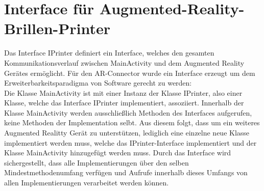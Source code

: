 \section{Interface für Augmented-Reality-Brillen-Printer}
Das Interface IPrinter definiert ein Interface, welches den gesamten Kommunikationsverlauf zwischen MainActivity und dem Augmented Reality Gerätes ermöglicht. Für den AR-Connector wurde ein Interface erzeugt um dem Erweiterbarkeitsparadigma von Software gerecht zu werden:\\
Die Klasse MainActivity ist mit einer Instanz der Klasse IPrinter, also einer Klasse, welche das Interface IPrinter implementiert, assoziiert. Innerhalb der Klasse MainActivity werden ausschließlich Methoden des Interfaces aufgerufen, keine Methoden der Implementation selbt. Aus diesem folgt, dass um ein weiteres Augmented Realitty Gerät zu unterstützen, lediglich eine einzelne neue Klasse implementiert werden muss, welche das IPrinter-Interface implementiert und der Klasse MainActivity hinzugefügt werden muss. Durch das Interface wird sichergestellt, dass alle Implementierungen über den selben Mindestmethodenumfang verfügen und Aufrufe innerhalb dieses Umfangs von allen Implementierungen verarbeitet werden können.
